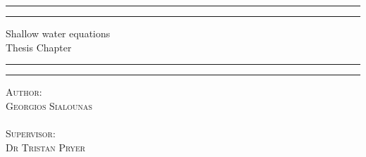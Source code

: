 \documentclass[12pt,a4paper]{article}
\numberwithin{equation}{section}
\theoremstyle{definition}
\begin{document}
	\begin{titlepage} %
		\centering %
		\scshape %
		\rule{\textwidth}{1.6pt}\vspace*{-\baselineskip}\vspace*{2pt} %
		\rule{\textwidth}{0.4pt} %
		
		{\LARGE Shallow water equations \\Thesis Chapter\\} %
		
		\vspace{0.75\baselineskip} %
		
		\rule{\textwidth}{0.4pt}\vspace*{-\baselineskip}\vspace{3.2pt} %
		\rule{\textwidth}{1.6pt} %
		
		
		
		
		

		
		\vspace{0.5\baselineskip} %
		
		{\scshape\Large Author:\\ Georgios Sialounas \\$\,$\\ Supervisor: \\Dr Tristan Pryer} %
		

\end{titlepage}
\end{document}
